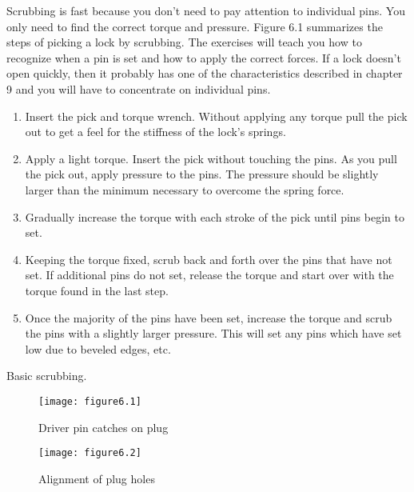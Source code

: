 Scrubbing is fast because you don't need to pay attention to individual pins. You only
need to find the correct torque and pressure. Figure 6.1 summarizes the steps of picking a
lock by scrubbing. The exercises will teach you how to recognize when a pin is set and how
to apply the correct forces. If a lock doesn't open quickly, then it probably has one of the
characteristics described in chapter 9 and you will have to concentrate on individual pins.

\begin{table}
    \begin{enumerate}
        \item Insert the pick and torque wrench. Without applying any torque pull the pick out to
        get a feel for the stiffness of the lock's springs.
        \item Apply a light torque. Insert the pick without touching the pins. As you pull the
        pick out, apply pressure to the pins. The pressure should be slightly larger than the
        minimum necessary to overcome the spring force.
        \item Gradually increase the torque with each stroke of the pick until pins begin to set.
        \item Keeping the torque fixed, scrub back and forth over the pins that have not set. If
        additional pins do not set, release the torque and start over with the torque found in
        the last step.
        \item Once the majority of the pins have been set, increase the torque and scrub the pins
        with a slightly larger pressure. This will set any pins which have set low due to beveled
        edges, etc.
    \end{enumerate}
    \caption{Basic scrubbing.}
\end{table}

\begin{figure}
    \texttt{[image: figure6.1]}
    \caption{Driver pin catches on plug}
\end{figure}

\begin{figure}
    \texttt{[image: figure6.2]}
    \caption{Alignment of plug holes}
\end{figure}
